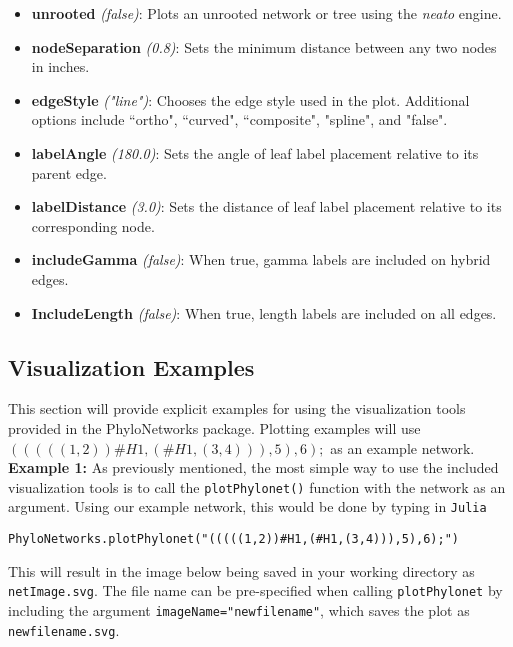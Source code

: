 \documentclass[12pt]{article}
\begin{document}
\begin{itemize}
\item \textbf{unrooted} \textit{(false)}: Plots an unrooted network or tree using the \textit{neato} engine.

\item \textbf{nodeSeparation} \textit{(0.8)}: Sets the minimum distance between any two nodes in inches.

\item \textbf{edgeStyle} \textit{("line")}: Chooses the edge style used in the plot. Additional options include ``ortho", ``curved", ``composite", "spline", and "false".

\item \textbf{labelAngle} \textit{(180.0)}: Sets the angle of leaf label placement relative to its parent edge.

\item \textbf{labelDistance} \textit{(3.0)}: Sets the distance of leaf label placement relative to its corresponding node.

\item \textbf{includeGamma} \textit{(false)}: When true, gamma labels are included on hybrid edges.

\item \textbf{IncludeLength} \textit{(false)}: When true, length labels are included on all edges.

\end{itemize}


\subsection{Visualization Examples}

This section will provide explicit examples for using the visualization tools provided in the PhyloNetworks package.
Plotting examples will use $(((((1,2))\#H1,(\#H1,(3,4))),5),6);$ as an example network. \\

\noindent \textbf{Example 1:} As previously mentioned, the most simple way to use the included visualization tools is to call the \texttt{plotPhylonet()} function with the network as an argument.
Using our example network, this would be done by typing in
\texttt{Julia}
\begin{lstlisting}
PhyloNetworks.plotPhylonet("(((((1,2))#H1,(#H1,(3,4))),5),6);")
\end{lstlisting}

This will result in the image below being saved in your working directory as \texttt{netImage.svg}.
The file name can be pre-specified when calling \texttt{plotPhylonet} by including the argument \texttt{imageName="newfilename"}, which saves the plot as \texttt{newfilename.svg}.
\end{document}
